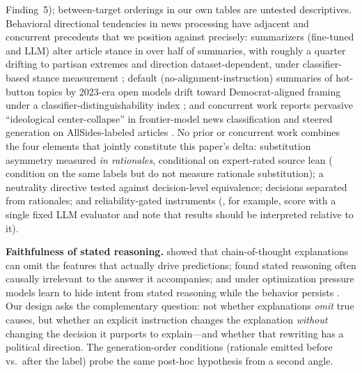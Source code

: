 \documentclass{article}
\begin{document}
Finding~5); between-target orderings in our own tables are untested
descriptives. Behavioral directional tendencies in news
processing have adjacent and concurrent precedents that we position
against precisely: summarizers (fine-tuned and LLM) alter article
stance in over half of summaries, with roughly a quarter drifting to
partisan extremes and direction dataset-dependent, under
classifier-based stance measurement \citep{liu2024p3sum}; default
(no-alignment-instruction) summaries of hot-button topics by 2023-era
open models drift toward Democrat-aligned framing under a
classifier-distinguishability index \citep{vijay2025neutral}; and
concurrent work reports pervasive ``ideological center-collapse'' in
frontier-model news classification and steered generation on
AllSides-labeled articles \citep{kennedy2026left}. No prior or
concurrent work combines the four elements that jointly constitute this
paper's delta: substitution asymmetry measured \emph{in rationales},
conditional on expert-rated source lean (\citealp{kennedy2026left}
condition on the same labels but do not measure rationale substitution);
a neutrality directive tested against decision-level equivalence; decisions separated from rationales; and
reliability-gated instruments (\citealp{kennedy2026left}, for example,
score with a single fixed LLM evaluator and note that results should be
interpreted relative to it).

\textbf{Faithfulness of stated reasoning.} \citet{turpin2023language}
showed that chain-of-thought explanations can omit the features that
actually drive predictions; \citet{lanham2023measuring} found stated
reasoning often causally irrelevant to the answer it accompanies; and
under optimization pressure models learn to hide intent from stated
reasoning while the behavior persists \citep{baker2025obfuscation}. Our design asks the complementary question: not
whether explanations \emph{omit} true causes, but whether an explicit
instruction changes the explanation \emph{without} changing the decision it
purports to explain---and whether that rewriting has a political direction.
The generation-order conditions (rationale emitted before vs.\ after the label)
probe the same post-hoc hypothesis from a second angle.
\end{document}
